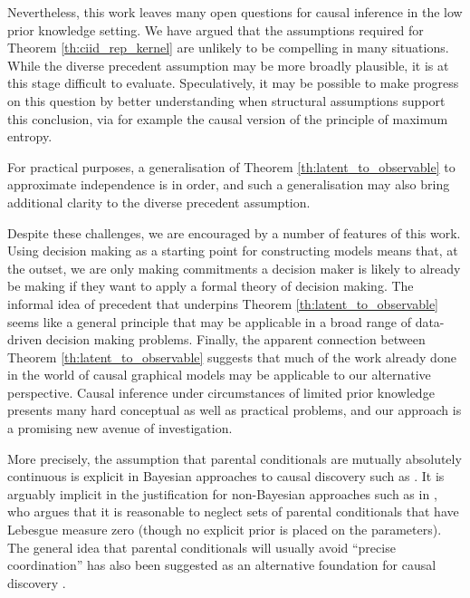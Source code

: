 {Nevertheless, this work leaves many open questions for causal inference in the low prior knowledge setting. We have argued that the assumptions required for Theorem \ref{th:ciid_rep_kernel} are unlikely to be compelling in many situations. While the diverse precedent assumption may be more broadly plausible, it is at this stage difficult to evaluate. Speculatively, it may be possible to make progress on this question by better understanding when structural assumptions support this conclusion, via for example the causal version of the principle of maximum entropy.

For practical purposes, a generalisation of Theorem \ref{th:latent_to_observable} to approximate independence is in order, and such a generalisation may also bring additional clarity to the diverse precedent assumption.

Despite these challenges, we are encouraged by a number of features of this work. Using decision making as a starting point for constructing models means that, at the outset, we are only making commitments a decision maker is likely to already be making if they want to apply a formal theory of decision making. The informal idea of precedent that underpins Theorem \ref{th:latent_to_observable} seems like a general principle that may be applicable in a broad range of data-driven decision making problems. Finally, the apparent connection between Theorem \ref{th:latent_to_observable} suggests that much of the work already done in the world of causal graphical models may be applicable to our alternative perspective. Causal inference under circumstances of limited prior knowledge presents many hard conceptual as well as practical problems, and our approach is a promising new avenue of investigation.



More precisely, the assumption that parental conditionals are mutually absolutely continuous is explicit in Bayesian approaches to causal discovery such as \citet{heckerman_learning_1995}. It is arguably implicit in the justification for non-Bayesian approaches such as in \citet{meek_strong_1995}, who argues that it is reasonable to neglect sets of parental conditionals that have Lebesgue measure zero (though no explicit prior is placed on the parameters). The general idea that parental conditionals will usually avoid ``precise coordination'' has also been suggested as an alternative foundation for causal discovery \citet{lemeire_replacing_2013,mooij_j.m._distinguishing_2016,janzingInformationgeometricApproachInferring2012}. 


}
